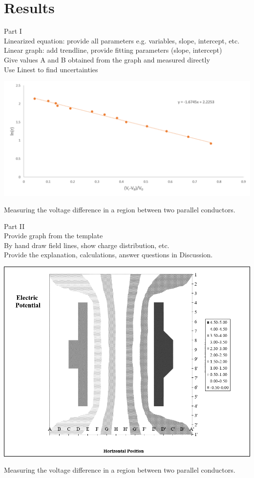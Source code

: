 \documentclass[letterpaper]{article}
\begin{document}
\section{Results}
Part I\\
Linearized equation: provide
all parameters e.g. variables,
slope, intercept, etc.\\
Linear graph: add trendline,
provide fitting parameters
(slope, intercept)\\
Give values A and B obtained
from the graph and measured
directly\\
Use Linest to find
uncertainties\\

\begin{table}[H]
  \centering
  \includegraphics[width=\textwidth]{chart1.png}
  \caption{Measuring the voltage difference in a region between two parallel conductors.}
\end{table}

Part II\\
Provide graph from the template\\
By hand draw field lines, show charge
distribution, etc.\\
Provide the explanation, calculations,
answer questions in Discussion.\\

\begin{table}[H]
  \centering
  \includegraphics[width=\textwidth]{chart2.png}
  \caption{Measuring the voltage difference in a region between two parallel conductors.}
\end{table}
\end{document}
